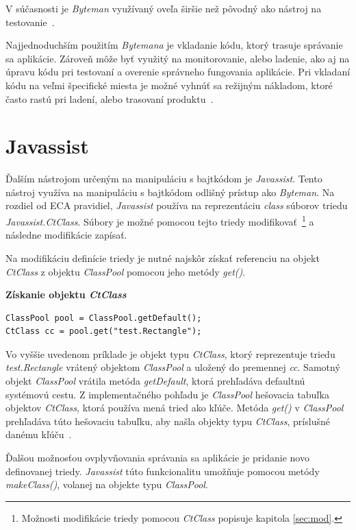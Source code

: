\documentclass[11pt,final,oneside]{fithesis}
\newenvironment{example}[1]
{
\vspace{3mm}
\noindent\textbf{#1}
\vspace{2mm}
}
{
\vspace{3mm}
}
\begin{document}
V súčasnosti je \textit{Byteman} využívaný oveľa širšie než pôvodný ako 
nástroj na testovanie~\cite{RedHat:Byteman}. 

Najjednoduchším použitím \textit{Bytemana} je vkladanie kódu, ktorý trasuje 
správanie sa aplikácie. Zároveň môže byť využitý na monitorovanie,
alebo ladenie, ako aj na úpravu kódu pri testovaní a overenie správneho 
fungovania aplikácie. Pri vkladaní kódu na veľmi špecifické miesta je možné
vyhnúť sa režijným nákladom, ktoré často rastú pri ladení, alebo trasovaní 
produktu~\cite{Byteman:Homepage}.

\chapter{Javassist}

Ďalším nástrojom určeným na manipuláciu s bajtkódom je \textit{Javassist}. 
Tento nástroj využíva na manipuláciu s bajtkódom odlišný prístup ako
\textit{Byteman}. Na rozdiel od ECA pravidiel, \textit{Javassist} používa na 
reprezentáciu \textit{class} súborov triedu \textit{Javassist.CtClass}.
Súbory je možné pomocou tejto triedy
modifikovať~\footnote{Možnosti modifikácie triedy pomocou \textit{CtClass} 
popisuje kapitola \ref{sec:mod}.} a následne modifikácie zapísať.

Na modifikáciu definície triedy je nutné najskôr získať referenciu na objekt
\textit{CtClass} z objektu \textit{ClassPool} pomocou jeho metódy
\textit{get()}.

\begin{example}{Získanie objektu \textit{CtClass}}
\begin{verbatim}
ClassPool pool = ClassPool.getDefault();
CtClass cc = pool.get("test.Rectangle");
\end{verbatim}
\end{example}

Vo vyššie uvedenom príklade je objekt typu \textit{CtClass}, ktorý reprezentuje
triedu \textit{test.Rectangle} vrátený objektom \textit{ClassPool} a uložený do
premennej \textit{cc}. Samotný objekt \textit{ClassPool} vrátila metóda 
\textit{getDefault}, ktorá prehľadáva defaultnú systémovú cestu. Z 
implementačného pohľadu je \textit{ClassPool} hešovacia tabuľka objektov
\textit{CtClass}, ktorá používa mená tried ako kľúče. Metóda \textit{get()} v
\textit{ClassPool} prehľadáva túto hešovaciu tabuľku, aby našla objekty typu
\textit{CtClass}, príslušné danému kľúču~\cite{Chiba:Javassist}.

Ďalšou možnosťou ovplyvňovania správania sa aplikácie je pridanie novo 
definovanej triedy. \textit{Javassist} túto funkcionalitu umožňuje pomocou 
metódy \textit{makeClass()}, volanej na objekte typu \textit{ClassPool}.
\end{document}
